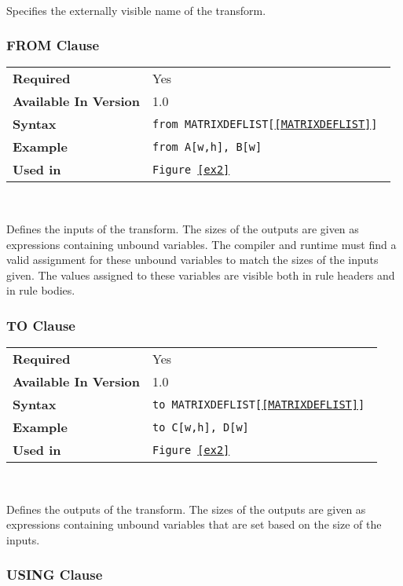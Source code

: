 \documentclass[11pt]{article}
\begin{document}
~

\noindent
Specifies the externally visible name of the transform.

\subsubsection{FROM Clause}

\begin{tabular}{| l | l |}
\hline
\bf Required & Yes                    \\
\bf Available In Version & 1.0        \\
\bf Syntax & \tt from MATRIXDEFLIST[\ref{MATRIXDEFLIST}] \\
\bf Example & \tt from A[w,h], B[w]     \\
\bf Used in & \tt Figure~\ref{ex2}      \\
\hline
\end{tabular}

~

\noindent
\noindent Defines the inputs of the transform.  The sizes of the outputs
are given as expressions containing unbound variables.  The compiler and
runtime must find a valid assignment for these unbound variables to match
the sizes of the inputs given.  The values assigned to these variables are
visible both in rule headers and in rule bodies.


\subsubsection{TO Clause}

\begin{tabular}{| l | l |}
\hline
\bf Required & Yes                    \\
\bf Available In Version & 1.0        \\
\bf Syntax & \tt to MATRIXDEFLIST[\ref{MATRIXDEFLIST}]     \\
\bf Example & \tt to C[w,h], D[w]     \\
\bf Used in & \tt Figure~\ref{ex2}      \\
\hline
\end{tabular}

~

\noindent Defines the outputs of the transform.  The sizes of the outputs
are given as expressions containing unbound variables that are set based on the size
of the inputs.

\subsubsection{USING Clause}
\end{document}
